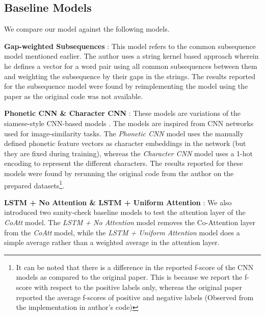 \documentclass[11pt,letterpaper]{article}
\begin{document}
\subsection{Baseline Models}

We compare our model against the following models. 

\textbf{Gap-weighted Subsequences} : This model refers to the common subsequence model \cite{rama2015automatic} mentioned earlier. The author uses a string kernel based approach wherein he defines a vector for a word pair using all common subsequences between them and weighting the subsequence by their gaps in the strings. The results reported for the subsequence model were found by reimplementing the model using the paper as the original code was not available.

\textbf{Phonetic CNN \& Character CNN} : These models are variations of the siamese-style CNN-based models \cite{rama2016siamese}. The models are inspired from CNN networks used for image-similarity tasks. The \textit{Phonetic CNN} model uses the manually defined phonetic feature vectors as character embeddings in the network (but they are fixed during training), whereas the \textit{Character CNN} model uses a 1-hot encoding to represent the different characters. The results reported for these models were found by rerunning the original code from the  author on the prepared datasets\footnote{It can be noted that there is a difference in the reported f-score of the CNN models as compared to the original paper. This is because we report the f-score with respect to the positive labels only, whereas the original paper reported the average f-scores of positive and negative labels (Observed from the implementation in author's code)}.

\textbf{LSTM + No Attention \& LSTM + Uniform Attention} : We also introduced two sanity-check baseline models to test the attention layer of the \textit{CoAtt} model. The \textit{LSTM + No Attention} model removes the Co-Attention layer from the \textit{CoAtt} model, while the \textit{LSTM + Uniform Attention} model does a simple average rather than a weighted average in the attention layer.
\end{document}
